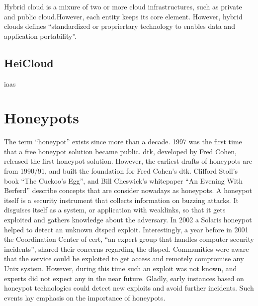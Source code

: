 Hybrid cloud is a mixure of two or more cloud infrastructures, such as private and public cloud.However, each entity keeps its core element. However, hybrid clouds defines \enquote{standardized or propriertary technology to enables data and application portability}\cite{Mell2011}.\\



\subsection{HeiCloud}

\ac{iaas}

\section{Honeypots}

The term \enquote{honeypot} exists since more than a decade. 1997 was the first time that a free honeypot solution became public. \ac{dtk}, developed by Fred Cohen, released the first honeypot solution. However, the earliest drafts of honeypots are from 1990/91, and built the foundation for Fred Cohen's \ac*{dtk}. Clifford Stoll's book \enquote{The Cuckoo's Egg}\cite{stroll2000}, and Bill Cheswick's whitepaper \enquote{An Evening With Berferd}\cite{Cheswick92} describe concepts that are consider nowadays as honeypots.\cite{Spitzner2003} A honeypot itself is a security instrument that collects information on buzzing attacks. It disguises itself as a system, or application with weaklinks, so that it gets exploited and gathers knowledge about the adversary. In 2002 a Solaris honeypot helped to detect an unknown dtspcd exploit. Interestingly, a year before in 2001 the Coordination Center of \ac{cert}, \enquote{an expert group that handles computer security incidents}, shared their concerns regarding the dtspcd. Communities were aware that the service could be exploited to get access and remotely compromise any Unix system. However, during this time such an exploit was not known, and experts did not expect any in the near future. Gladly, early instances based on honeypot technologies could detect new exploits and avoid further incidents. Such events lay emphasis on the importance of honeypots.


